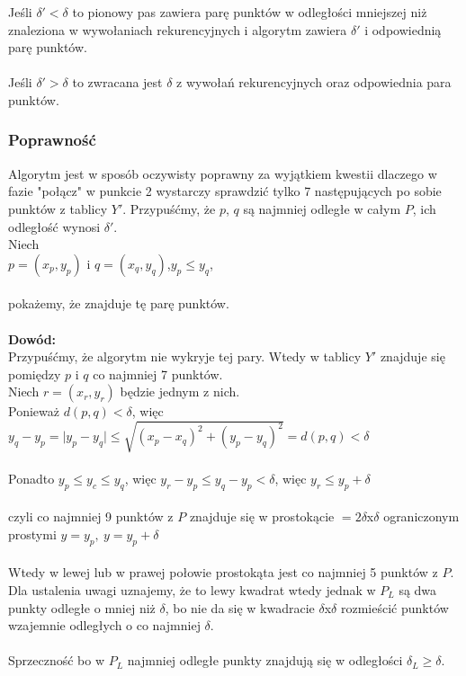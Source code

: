 Jeśli $\delta'<\delta$ to pionowy pas zawiera parę punktów w odległości mniejszej niż znaleziona w  wywołaniach rekurencyjnych i algorytm zawiera $\delta'$ i odpowiednią parę punktów.\\
\\
Jeśli $\delta'>\delta$ to zwracana jest $\delta$ z wywołań rekurencyjnych oraz odpowiednia para punktów.

\subsubsection{Poprawność}
Algorytm jest w sposób oczywisty poprawny za wyjątkiem kwestii dlaczego w fazie "połącz" w punkcie 2 wystarczy sprawdzić tylko 7 następujących po sobie punktów z tablicy $Y'$. Przypuśćmy, że $p$, $q$ są najmniej odległe w całym $P$, ich odległość wynosi $\delta'$.\\
Niech \\
\tab $p=(x_p,y_p)$ i $q=(x_q,y_q)$,\tab \tab $y_p\leq y_q$,\\
\\
pokażemy, że znajduje tę parę punktów.\\
\\
\textbf{Dowód: }\\
Przypuśćmy, że algorytm nie wykryje tej pary. Wtedy w tablicy $Y'$ znajduje się pomiędzy $p$ i $q$ co najmniej 7 punktów.\\
Niech $r=(x_r,y_r)$ będzie jednym z nich.\\
Ponieważ $d(p,q)<\delta$, więc $y_q-y_p = \vert y_p - y_q \vert \leq \sqrt{(x_p-x_q)^2+(y_p-y_q)^2}=d(p,q)<\delta$\\
\\
Ponadto $y_p\leq y_c\leq y_q$, więc $y_r-y_p \leq y_q-y_p<\delta$, więc $y_r\leq y_p + \delta$\\
\\
czyli co najmniej 9 punktów z $P$ znajduje się w prostokącie $=2\delta$x$\delta$ ograniczonym prostymi $y=y_p,\ y=y_p+\delta$\\
\\
Wtedy w lewej lub w prawej połowie prostokąta jest co najmniej 5 punktów z $P$. Dla ustalenia uwagi uznajemy, że to lewy kwadrat wtedy jednak w $P_L$ są dwa punkty odległe o mniej niż $\delta$, bo nie da się w kwadracie $\delta$x$\delta$ rozmieścić punktów wzajemnie odległych o co najmniej $\delta$.\\
\\
Sprzeczność bo w $P_L$ najmniej odległe punkty znajdują się w odległości $\delta_L \geq \delta$.\\
\\
